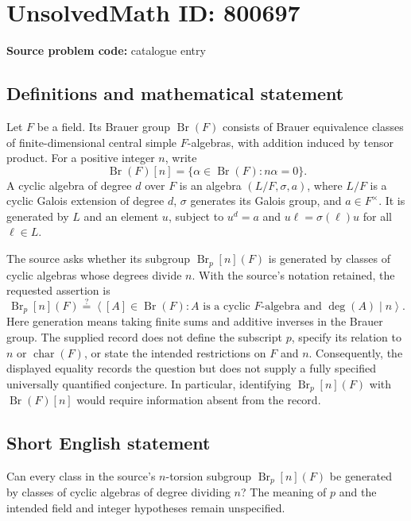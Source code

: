 \documentclass[11pt]{article}
\begin{document}
\section*{UnsolvedMath ID: 800697}
\textbf{Source problem code:} catalogue entry
\subsection{Definitions and mathematical statement}
Let \(F\) be a field. Its Brauer group \(\operatorname{Br}(F)\) consists of Brauer equivalence classes of finite-dimensional central simple \(F\)-algebras, with addition induced by tensor product. For a positive integer \(n\), write
\[
\operatorname{Br}(F)[n]=\{\alpha\in\operatorname{Br}(F):n\alpha=0\}.
\]
A cyclic algebra of degree \(d\) over \(F\) is an algebra \((L/F,\sigma,a)\), where \(L/F\) is a cyclic Galois extension of degree \(d\), \(\sigma\) generates its Galois group, and \(a\in F^\times\). It is generated by \(L\) and an element \(u\), subject to \(u^d=a\) and \(u\ell=\sigma(\ell)u\) for all \(\ell\in L\).

The source asks whether its subgroup \(\operatorname{Br}_p[n](F)\) is generated by classes of cyclic algebras whose degrees divide \(n\). With the source's notation retained, the requested assertion is
\[
\operatorname{Br}_p[n](F)
\stackrel{?}{=}
\left\langle [A]\in\operatorname{Br}(F):
A\text{ is a cyclic }F\text{-algebra and }\deg(A)\mid n
\right\rangle.
\]
Here generation means taking finite sums and additive inverses in the Brauer group. The supplied record does not define the subscript \(p\), specify its relation to \(n\) or \(\operatorname{char}(F)\), or state the intended restrictions on \(F\) and \(n\). Consequently, the displayed equality records the question but does not supply a fully specified universally quantified conjecture. In particular, identifying \(\operatorname{Br}_p[n](F)\) with \(\operatorname{Br}(F)[n]\) would require information absent from the record.
\subsection{Short English statement}
Can every class in the source's \(n\)-torsion subgroup \(\operatorname{Br}_p[n](F)\) be generated by classes of cyclic algebras of degree dividing \(n\)? The meaning of \(p\) and the intended field and integer hypotheses remain unspecified.
\end{document}
